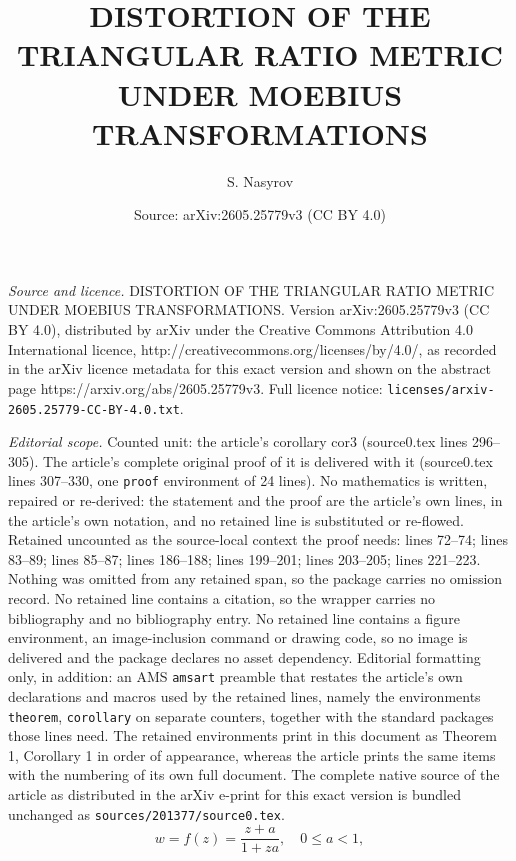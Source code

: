 \documentclass[10pt,a4paper]{amsart}
\title{DISTORTION OF THE TRIANGULAR RATIO METRIC UNDER MOEBIUS TRANSFORMATIONS}
\author{S. Nasyrov}
\date{Source: arXiv:2605.25779v3 (CC BY 4.0)}
\begin{document}
\maketitle

\noindent\emph{Source and licence.} DISTORTION OF THE TRIANGULAR RATIO METRIC UNDER MOEBIUS TRANSFORMATIONS. Version arXiv:2605.25779v3 (CC BY 4.0), distributed by arXiv under the Creative Commons Attribution 4.0 International licence, http://creativecommons.org/licenses/by/4.0/, as recorded in the arXiv licence metadata for this exact version and shown on the abstract page https://arxiv.org/abs/2605.25779v3. Full licence notice: \texttt{licenses/arxiv-2605.25779-CC-BY-4.0.txt}.\par\smallskip

\noindent\textit{Editorial scope.} Counted unit: the article's corollary cor3 (source0.tex lines 296--305). The article's complete original proof of it is delivered with it (source0.tex lines 307--330, one \texttt{proof} environment of 24 lines). No mathematics is written, repaired or re-derived: the statement and the proof are the article's own lines, in the article's own notation, and no retained line is substituted or re-flowed.  Retained uncounted as the source-local context the proof needs: lines 72--74; lines 83--89; lines 85--87; lines 186--188; lines 199--201; lines 203--205; lines 221--223.  Nothing was omitted from any retained span, so the package carries no omission record.  No retained line contains a citation, so the wrapper carries no bibliography and no bibliography entry.  No retained line contains a figure environment, an image-inclusion command or drawing code, so no image is delivered and the package declares no asset dependency.  Editorial formatting only, in addition: an AMS \texttt{amsart} preamble that restates the article's own declarations and macros used by the retained lines, namely the environments \texttt{theorem}, \texttt{corollary} on separate counters, together with the standard packages those lines need.  The retained environments print in this document as Theorem 1, Corollary 1 in order of appearance, whereas the article prints the same items with the numbering of its own full document.  The complete native source of the article as distributed in the arXiv e-print for this exact version is bundled unchanged as \texttt{sources/201377/source0.tex}.
\begin{equation}\label{moeb}
w=f(z)=\frac{z+a}{1+za}, \quad 0\le a<1,
\end{equation}
\end{document}
